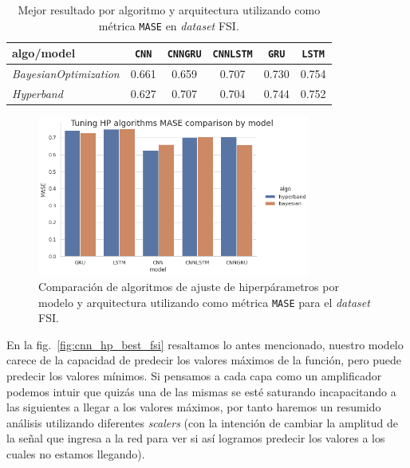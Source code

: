 \documentclass[a4paper,12pt]{article}
\begin{document}
\begin{table}[H]
\centering
\begin{tabular}{l|ccccc}
\hline
algo/model & \texttt{CNN} & \texttt{CNNGRU} & \texttt{CNNLSTM} & \texttt{GRU} & \texttt{LSTM} \\ \hline
\textit{BayesianOptimization}         & 0.661        & 0.659           &    0.707         &     0.730    & 0.754         \\
\textit{Hyperband}         & 0.627        & 0.707           & 0.704            & 0.744        & 0.752         \\ \hline
\end{tabular}
\caption{Mejor resultado por algoritmo y arquitectura utilizando como métrica \texttt{MASE} en \textit{dataset} FSI.}
\label{tab:algo_vs_arch_mase_fsi}
\end{table}

\begin{figure}[H]
	\begin{center}
	\includegraphics[width=0.8\textwidth]{model_vs_algo_hp_mase_fsi.png}
  	\caption{Comparación de algoritmos de ajuste de hiperpárametros por modelo y arquitectura utilizando como métrica \texttt{MASE} para el \textit{dataset} FSI.}
  	\label{fig:algo_comparison_mase_fsi}
  	\end{center}
\end{figure}

En la fig.~\ref{fig:cnn_hp_best_fsi} resaltamos lo antes mencionado, nuestro modelo carece de la capacidad de predecir los valores máximos de la función, pero puede predecir los valores mínimos. Si pensamos a cada capa como un amplificador podemos intuir que quizás una de las mismas se esté saturando incapacitando a las siguientes a llegar a los valores máximos, por tanto haremos un resumido análisis utilizando diferentes \textit{scalers} (con la intención de cambiar la amplitud de la señal que ingresa a la red para ver si así logramos predecir los valores a los cuales no estamos llegando).
\end{document}
